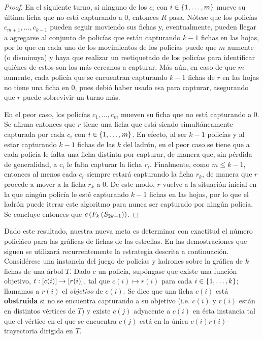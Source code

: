 \begin{proof}
    En el siguiente turno, si ninguno de los $c_{i}$ con $i\in\{1,\dots, m\}$ mueve
    su \'ultima ficha que no est\'a capturando a $0$, entonces $R$ pasa.
    N\'otese que los polic\'ias $c_{m+1},\dots,c_{{k-1}}$ pueden seguir moviendo
    sus fichas y, eventualmente, pueden llegar a agregarse al conjunto de
    polic\'ias que est\'an capturando $k-1$ fichas en las hojas, por lo que en
    cada uno de los movimientos de los polic\'ias puede que $m$ aumente (o
    disminuya) y haya que realizar un reetiquetado de los polic\'ias para
    identificar qui\'enes de estos son los m\'as cercanos a capturar. M\'as
    a\'un, en caso de que $m$ aumente, cada polic\'ia que se encuentran
    capturando $k-1$ fichas de $r$ en las hojas no tiene una ficha en $0$, pues
    debi\'o haber usado esa para capturar, asegurando que $r$ puede sobrevivir
    un turno m\'as.

    En el peor caso, los polic\'ias $c_1,\dots, c_m$ mueven su ficha que no
    est\'a capturando a $0$. Se afirma entonces que $r$ tiene una ficha que
    est\'a siendo simult\'aneamente capturada por cada $c_{i}$ con $i\in
    \{1,\dots, m\}$. En efecto, al ser $k-1$ polic\'ias y al estar capturando $k-1$
    fichas de las $k$ del ladr\'on, en el peor caso se tiene que a cada
    polic\'ia le falta una ficha distinta por capturar, de manera que, sin
    p\'erdida de generalidad, a $c_{i}$ le falta capturar la ficha $r_i$.
    Finalmente, como $m\leq k-1$, entonces al menos cada $c_{i}$ siempre
    estar\'a capturando la ficha $r_k$, de manera que $r$ procede a mover a la
    ficha $r_k$ a $0$. De este modo, $r$ vuelve a la situaci\'on inicial en la
    que ning\'un polic\'ia le est\'e capturando $k-1$ fichas en las hojas, por
    lo que el ladr\'on puede iterar este algoritmo para nunca ser capturado por
    ning\'un polic\'ia. Se concluye entonces que $c\left( F_{k}\left( S_{2k-1}\right)\right)$.
    
\end{proof}

Dado este resultado, nuestra nueva meta es determinar con exactitud el n\'umero
polici\'aco para las gr\'aficas de fichas de las estrellas. En las
demostraciones que siguen se utilizar\'a recurrentemente la estrategia descrita
a continuaci\'on. Consid\'erese una instancia del juego de polic\'ias y ladrones
sobre la gr\'afica de $k$ fichas de una \'arbol $T$. Dado $c$ un polic\'ia,
sup\'ongase que existe una funci\'on objetivo, $t:\left[ c(i)\right]\to \left[ r(i)\right]$, tal que
$c(i)\mapsto r(i)$ para cada $i\in\{1,\dots, k\}$; llamamos a $r(i)$ el
\textit{objetivo} de $c(i)$. Se dice que una ficha $c(i)$ est\'a
\textbf{obstruida} si no se encuentra capturando a su objetivo (i.e. $c(i)$ y
$r(i)$ est\'an en distintos v\'ertices de $T$) y existe $c(j)$ adyacente a
$c(i)$ en \'esta instancia tal que el v\'ertice en el que se encuentra $c(j)$
est\'a en la \'unica $c(i)r(i)$-trayectoria dirigida en $T$.

